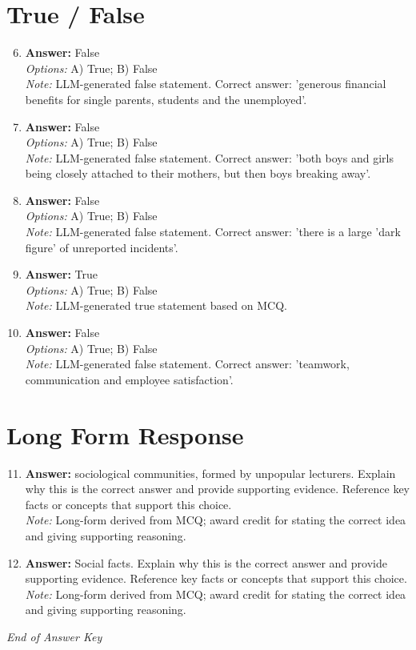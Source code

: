 \documentclass[12pt]{article}
\begin{document}
\section*{True / False}
\begin{enumerate}[label=\arabic*.]
\setcounter{enumi}{5}
\item \textbf{Answer:} False
\\ \textit{Options:} A) True; B) False
\\ \textit{Note:} LLM-generated false statement. Correct answer: 'generous financial benefits for single parents, students and the unemployed'.
\item \textbf{Answer:} False
\\ \textit{Options:} A) True; B) False
\\ \textit{Note:} LLM-generated false statement. Correct answer: 'both boys and girls being closely attached to their mothers, but then boys breaking away'.
\item \textbf{Answer:} False
\\ \textit{Options:} A) True; B) False
\\ \textit{Note:} LLM-generated false statement. Correct answer: 'there is a large 'dark figure' of unreported incidents'.
\item \textbf{Answer:} True
\\ \textit{Options:} A) True; B) False
\\ \textit{Note:} LLM-generated true statement based on MCQ.
\item \textbf{Answer:} False
\\ \textit{Options:} A) True; B) False
\\ \textit{Note:} LLM-generated false statement. Correct answer: 'teamwork, communication and employee satisfaction'.
\end{enumerate}

\section*{Long Form Response}
\begin{enumerate}[label=\arabic*.]
\setcounter{enumi}{10}
\item \textbf{Answer:} sociological communities, formed by unpopular lecturers. Explain why this is the correct answer and provide supporting evidence. Reference key facts or concepts that support this choice.
\\ \textit{Note:} Long-form derived from MCQ; award credit for stating the correct idea and giving supporting reasoning.
\item \textbf{Answer:} Social facts. Explain why this is the correct answer and provide supporting evidence. Reference key facts or concepts that support this choice.
\\ \textit{Note:} Long-form derived from MCQ; award credit for stating the correct idea and giving supporting reasoning.
\end{enumerate}

\vfill
\noindent\textit{End of Answer Key}
\end{document}
